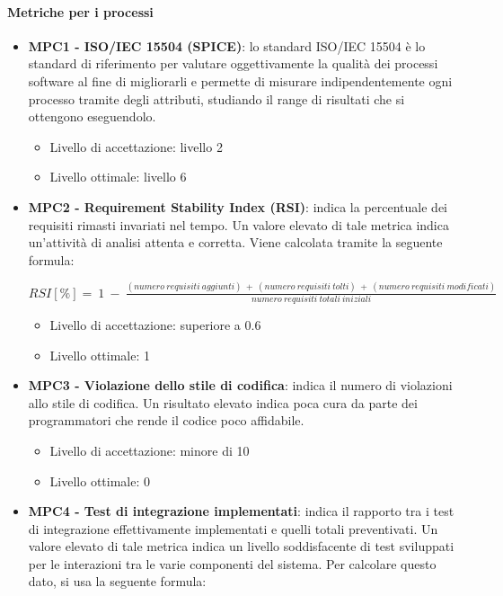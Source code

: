 	\paragraph{Metriche per i processi}
	\begin{itemize}
	 \item \textbf{MPC1 - ISO/IEC 15504 (SPICE)}: lo standard ISO/IEC 15504 è lo standard di riferimento per valutare oggettivamente la qualità dei processi software al fine di migliorarli e permette di misurare indipendentemente ogni processo tramite degli attributi, studiando il range di risultati che si ottengono eseguendolo. 
	 \begin{itemize}
	 \item Livello di accettazione: livello 2
	 \item Livello ottimale: livello 6
	 \end{itemize}
	 \item \textbf{MPC2 - Requirement Stability Index (RSI)}: indica la percentuale dei requisiti rimasti invariati nel tempo. Un valore elevato di tale metrica indica un’attività di analisi attenta e corretta. Viene calcolata tramite la seguente formula:
	 \begin{center}
		$RSI[\%] =\ 1\ -\ \frac{(numero\ requisiti\ aggiunti)\ +\ (numero\ requisiti\ tolti)\ +\ (numero\ requisiti\ modificati)}{numero\ requisiti\ totali\ iniziali}$
	\end{center}
	\begin{itemize}
	 \item Livello di accettazione: superiore a 0.6
	 \item Livello ottimale: 1
	 \end{itemize}
	\item \textbf{MPC3 - Violazione dello stile di codifica}: indica il numero di violazioni allo stile di codifica. Un risultato elevato indica poca cura da parte dei programmatori che rende il codice poco affidabile. 
	\begin{itemize}
	 \item Livello di accettazione: minore di 10
	 \item Livello ottimale: 0
	 \end{itemize}
	\item \textbf{MPC4 - Test di integrazione implementati}: indica il rapporto tra i test di integrazione effettivamente implementati e quelli totali preventivati. Un valore elevato di tale metrica indica un livello soddisfacente di test sviluppati per le interazioni tra le varie componenti del sistema. Per calcolare questo dato, si usa la seguente formula: 

\end{itemize}
